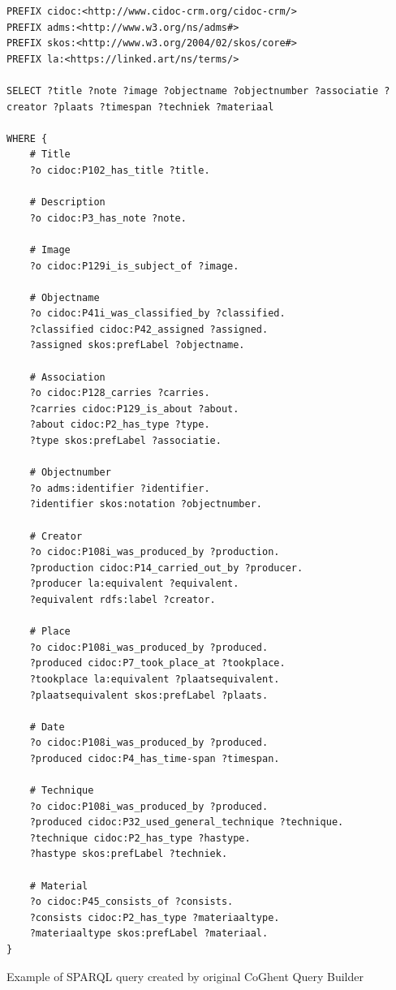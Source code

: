 \begin{listing}[htbp]
    \begin{verbatim}
PREFIX cidoc:<http://www.cidoc-crm.org/cidoc-crm/>
PREFIX adms:<http://www.w3.org/ns/adms#>
PREFIX skos:<http://www.w3.org/2004/02/skos/core#>
PREFIX la:<https://linked.art/ns/terms/>

SELECT ?title ?note ?image ?objectname ?objectnumber ?associatie ?creator ?plaats ?timespan ?techniek ?materiaal

WHERE {
    # Title
    ?o cidoc:P102_has_title ?title.

    # Description
    ?o cidoc:P3_has_note ?note.

    # Image
    ?o cidoc:P129i_is_subject_of ?image.

    # Objectname
    ?o cidoc:P41i_was_classified_by ?classified.
    ?classified cidoc:P42_assigned ?assigned.
    ?assigned skos:prefLabel ?objectname.

    # Association
    ?o cidoc:P128_carries ?carries.
    ?carries cidoc:P129_is_about ?about.
    ?about cidoc:P2_has_type ?type.
    ?type skos:prefLabel ?associatie.

    # Objectnumber
    ?o adms:identifier ?identifier.
    ?identifier skos:notation ?objectnumber.

    # Creator
    ?o cidoc:P108i_was_produced_by ?production.
    ?production cidoc:P14_carried_out_by ?producer.
    ?producer la:equivalent ?equivalent.
    ?equivalent rdfs:label ?creator.

    # Place
    ?o cidoc:P108i_was_produced_by ?produced.
    ?produced cidoc:P7_took_place_at ?tookplace.
    ?tookplace la:equivalent ?plaatsequivalent.
    ?plaatsequivalent skos:prefLabel ?plaats.

    # Date
    ?o cidoc:P108i_was_produced_by ?produced.
    ?produced cidoc:P4_has_time-span ?timespan.

    # Technique
    ?o cidoc:P108i_was_produced_by ?produced.
    ?produced cidoc:P32_used_general_technique ?technique.
    ?technique cidoc:P2_has_type ?hastype.
    ?hastype skos:prefLabel ?techniek.

    # Material
    ?o cidoc:P45_consists_of ?consists.
    ?consists cidoc:P2_has_type ?materiaaltype.
    ?materiaaltype skos:prefLabel ?materiaal.
}
    \end{verbatim}
    \caption{Example of SPARQL query created by original CoGhent Query Builder}
    \label{lst:coghent_builder_original}
\end{listing}